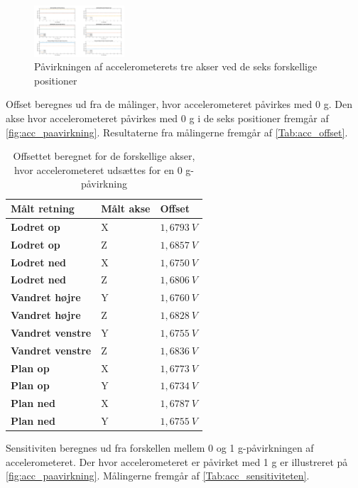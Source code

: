 \begin{figure}[H]
\centering
\includegraphics[width=0.3\textwidth]{figures/paavirkning}
\caption{Påvirkningen af accelerometerets tre akser ved de seks forskellige positioner}
\label{fig:paavirkning}
\end{figure}

Offset beregnes ud fra de målinger, hvor accelerometeret påvirkes med 0 g. Den akse hvor accelerometeret påvirkes med 0 g i de seks positioner fremgår af \autoref{fig:acc_paavirkning}. Resultaterne fra målingerne fremgår af \autoref{Tab:acc_offset}. 

\begin{table}[H]
	\centering
	\begin{tabular}{|l|l|l|}
	\textbf{Målt retning} & \textbf{Målt akse} & \textbf{Offset} \\ \hline
    \textbf{Lodret op} 		& X 		& $1,6793~V$ 	\\ \hline
    \textbf{Lodret op} 		& Z 		& $1,6857~V$ 	 \\ \hline
    \textbf{Lodret ned}		& X 		& $1,6750~V$ 	\\ \hline
    \textbf{Lodret ned}		& Z 		& $1,6806~V$  	\\ \hline
    \textbf{Vandret højre} 	& Y 		& $1,6760~V$    \\ \hline     
    \textbf{Vandret højre} 	& Z 		& $1,6828~V$ 	\\ \hline
    \textbf{Vandret venstre}	& Y 		& $1,6755~V$ 	\\ \hline
    \textbf{Vandret venstre}	& Z 		& $1,6836~V$		\\ \hline
    \textbf{Plan op} 		& X 		& $1,6773~V$		\\ \hline		
    \textbf{Plan op} 		& Y 		& $1,6734~V$    \\ \hline
    \textbf{Plan ned} 		& X 		& $1,6787~V$		\\ \hline
    \textbf{Plan ned} 		& Y 		& $1,6755~V$		\\ \hline
	\end{tabular}
	\caption{Offsettet beregnet for de forskellige akser, hvor accelerometeret udsættes for en 0 g-påvirkning}
	\label{Tab:acc_offset}
\end{table}

Sensitiviten beregnes ud fra forskellen mellem 0 og 1 g-påvirkningen af accelerometeret. Der hvor accelerometeret er påvirket med 1 g er illustreret på \autoref{fig:acc_paavirkning}. Målingerne fremgår af \autoref{Tab:acc_sensitiviteten}. 

